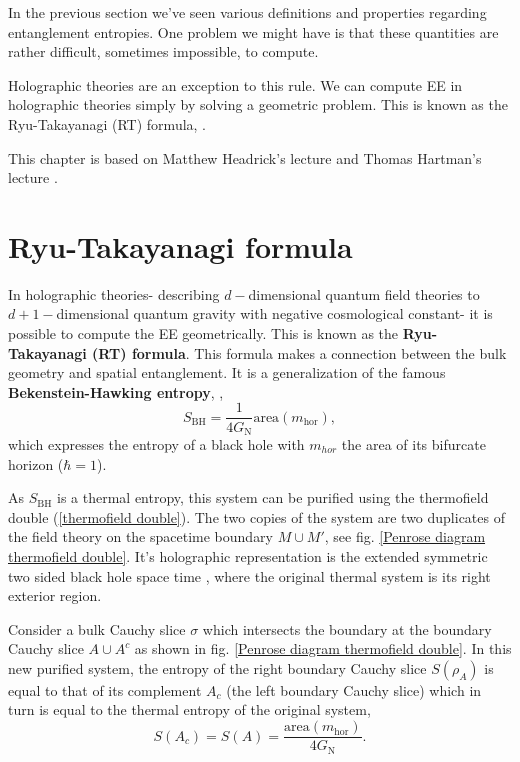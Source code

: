 In the previous section we've seen various definitions and properties regarding entanglement entropies. One problem we might have is that these quantities are rather difficult, sometimes impossible, to compute.

Holographic theories are an exception to this rule. We can compute EE in holographic theories simply by solving a geometric problem. This is known as the Ryu-Takayanagi (RT) formula, \cite{Ryu, Ryu_2006}.

This chapter is based on Matthew Headrick's lecture \cite{entropy} and Thomas Hartman's lecture \cite{TomHartman}.

\section{Ryu-Takayanagi formula}
In holographic theories- describing $d-$dimensional quantum field theories to $d+1-$dimensional quantum gravity with negative cosmological constant- it is possible to compute the EE geometrically. This is known as the \textbf{Ryu-Takayanagi (RT) formula}. This formula makes a connection between the bulk geometry and spatial entanglement. It is a generalization of the famous \textbf{Bekenstein-Hawking entropy}, \cite{PhysRevD.7.2333, PhysRevLett.26.1344},
\begin{equation}\label{Bekenstein-Hawking}
    S_{\text{BH}}= \frac{1}{4G_\text{N}}\text{area}\left(m_{\text{hor}}\right),
\end{equation}
which expresses the entropy of a black hole with $m_{hor}$ the area of its bifurcate horizon ($\hbar=1$). 

As $S_{\text{BH}}$ is a thermal entropy, this system can be purified using the thermofield double (\ref{thermofield double}). The two copies of the system are two duplicates of the field theory on the spacetime boundary $M\cup M'$, see fig. \ref{Penrose diagram thermofield double}. It's holographic representation is the extended symmetric two sided black hole space time \cite{ISRAEL1976107, PhysRevD.48.1506}, where the original thermal system is its right exterior region.

Consider a bulk Cauchy slice $\sigma$ which intersects the boundary at the boundary Cauchy slice $A\cup A^c$ as shown in fig. \ref{Penrose diagram thermofield double}. In this new purified system, the entropy of the right boundary Cauchy slice $S(\rho_A)$ is equal to that of its complement $A_c$ (the left boundary Cauchy slice) which in turn is equal to the thermal entropy of the original system,
\begin{equation}\label{BH A = Ac}
    S\left(A_c\right) = S\left(A\right) = \frac{\text{area}\left(m_{\text{hor}}\right)}{4G_\text{N}}.
\end{equation}

